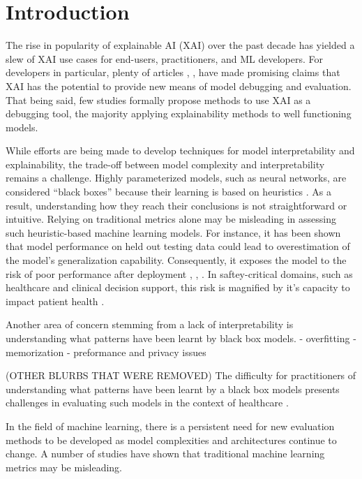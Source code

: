 \documentclass[conference]{IEEEtran}
\begin{document}
\section{Introduction}

The rise in popularity of explainable AI (XAI) over the past decade has yielded a slew of XAI use cases for end-users, practitioners, and ML developers. For developers in particular, plenty of articles \cite{defuse}, \cite{revisitingsanity}, \cite{peeking} have made promising claims that XAI has the potential to provide new means of model debugging and evaluation. That being said, few studies formally propose methods to use XAI as a debugging tool, the majority applying explainability methods to well functioning models. 


While efforts are being made to develop techniques for model interpretability and explainability, the trade-off between model complexity and interpretability remains a challenge. Highly parameterized models, such as neural networks, are considered ``black boxes'' because their learning is based on heuristics \cite{heuristics}. As a result, understanding how they reach their conclusions is not straightforward or intuitive.
Relying on traditional metrics alone may be misleading in assessing such heuristic-based machine learning models. For instance, it has been shown that model performance on held out testing data could lead to overestimation of the model's generalization capability. Consequently, it exposes the model to the risk of poor performance after deployment \cite{imagenet}, \cite{beyond}, \cite{defuse}. 
In saftey-critical domains, such as healthcare and clinical decision support, this risk is magnified by it's capacity to impact patient health \cite{CDS}. 

Another area of concern stemming from a lack of interpretability is understanding what patterns have been learnt by black box models. 
- overfitting
- memorization 
- preformance and privacy issues

(OTHER BLURBS THAT WERE REMOVED)
The difficulty for practitioners of understanding what patterns have been learnt by a black box models presents challenges in evaluating such models in the context of healthcare \cite{medicalsaftey}. 

In the field of machine learning, there is a persistent need for new evaluation methods to be developed as model complexities and architectures continue to change. A number of studies have shown that traditional machine learning metrics may be misleading.
\end{document}
